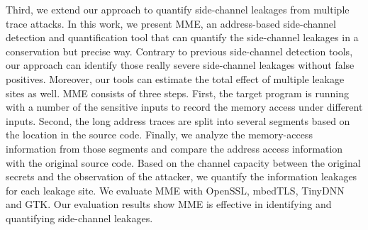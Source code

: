 Third, we extend our approach to quantify side-channel leakages from multiple trace attacks. In this work, we present MME, an address-based side-channel detection and quantification tool that can quantify the side-channel leakages in a conservation but precise way. Contrary to previous side-channel detection tools, our approach can identify those really severe side-channel leakages without false positives. Moreover, our tools can estimate the total effect of multiple leakage sites as well. MME consists of three steps. First, the target program is running with a number of the sensitive inputs to record the memory access under different inputs. Second, the long address traces are split into several segments based on the location in the source code. Finally, we analyze the memory-access information from those segments and compare the address access information with the original source code. Based on the channel capacity between the original secrets and the observation of the attacker, we quantify the information leakages for each leakage site. We evaluate MME with OpenSSL, mbedTLS, TinyDNN and GTK. Our evaluation results show MME is effective in identifying and quantifying side-channel leakages.
